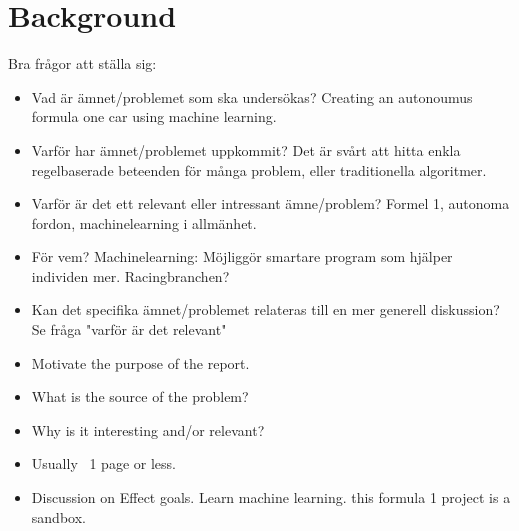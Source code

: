 
\chapter*{Background}
Bra frågor att ställa sig:

\begin{itemize}
    \item Vad är ämnet/problemet som ska undersökas?  Creating an autonoumus formula one car using machine learning.
    \item Varför har ämnet/problemet uppkommit? Det är svårt att hitta enkla regelbaserade beteenden för många problem, eller traditionella algoritmer.
    \item Varför är det ett relevant eller intressant ämne/problem? Formel 1, autonoma fordon, machinelearning i allmänhet.
    \item För vem? Machinelearning: Möjliggör smartare program som hjälper individen mer. Racingbranchen?
    \item Kan det specifika ämnet/problemet relateras till en mer generell diskussion? Se fråga "varför är det relevant"
\end{itemize}

\begin{itemize}
  \item Motivate the purpose of the report.
  \item What is the source of the problem?
  \item Why is it interesting and/or relevant?
  \item Usually ~1 page or less.
  \item Discussion on Effect goals. Learn machine learning. this formula 1 project is a sandbox.
\end{itemize}
